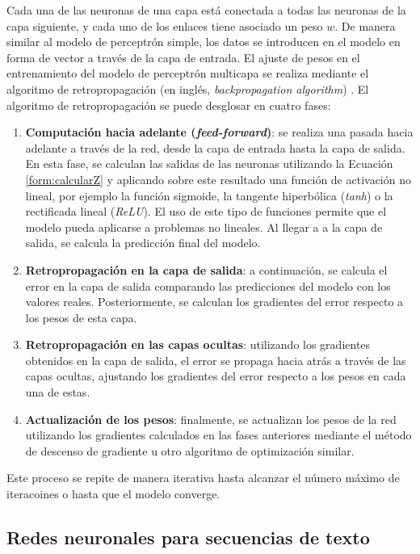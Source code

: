 \documentclass[11pt,spanish,listoffigures,listoftables]{tfgetsinf}
\begin{document}
Cada una de las neuronas de una capa está conectada a todas las neuronas de la capa siguiente, y cada uno de los enlaces tiene asociado un peso $w$. De manera similar al modelo de perceptrón simple, los datos se introducen en el modelo en forma de vector a través de la capa de entrada. El ajuste de pesos en el entrenamiento del modelo de perceptrón multicapa se realiza mediante el algoritmo de retropropagación (en inglés, \textit{backpropagation algorithm}) \cite{Rojas1996}. El algoritmo de retropropagación se puede desglosar en cuatro fases:

\begin{enumerate}
	\item \textbf{Computación hacia adelante (\textit{feed-forward})}: se realiza una pasada hacia adelante a través de la red, desde la capa de entrada hasta la capa de salida. En esta fase, se calculan las salidas de las neuronas utilizando la Ecuación \ref{form:calcularZ} y aplicando sobre este resultado una función de activación no lineal, por ejemplo la función sigmoide, la tangente hiperbólica (\textit{tanh}) o la rectificada lineal (\textit{ReLU}). El uso de este tipo de funciones permite que el modelo pueda aplicarse a problemas no lineales. Al llegar a a la capa de salida, se calcula la predicción final del modelo.
	\item \textbf{Retropropagación en la capa de salida}: a continuación, se calcula el error en la capa de salida comparando las predicciones del modelo con los valores reales. Posteriormente, se calculan los gradientes del error respecto a los pesos de esta capa.
	\item \textbf{Retropropagación en las capas ocultas}: utilizando los gradientes obtenidos en la capa de salida, el error se propaga hacia atrás a través de las capas ocultas, ajustando los gradientes del error respecto a los pesos en cada una de estas.
	\item \textbf{Actualización de los pesos}: finalmente, se actualizan los pesos de la red utilizando los gradientes calculados en las fases anteriores mediante el método de descenso de gradiente u otro algoritmo de optimización similar.
\end{enumerate}

Este proceso se repite de manera iterativa hasta alcanzar el número máximo de iteracoines o hasta que el modelo converge.

\subsection{Redes neuronales para secuencias de texto}
\end{document}
